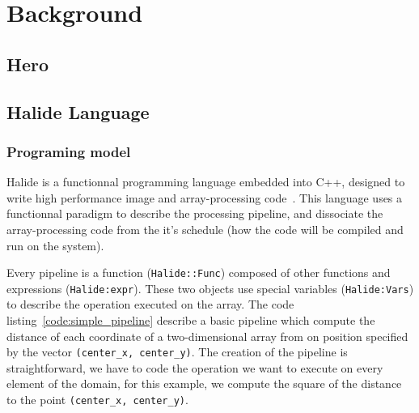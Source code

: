 
\chapter{Background}
\section{Hero}
\section{Halide Language}
	\subsection { Programing model}
		Halide is a functionnal programming language embedded into C++, designed to write high performance image and array-processing code~\cite{Web:Halide}. This language uses a functionnal paradigm to describe the processing pipeline, and dissociate the array-processing code from the it's schedule (how the code will be compiled and run on the system). 


		Every pipeline is a function (\verb|Halide::Func|) composed of other functions and expressions (\verb|Halide:expr|). These two objects  use special variables (\verb|Halide:Vars|) to describe the operation executed on the array. The code listing~\ref{code:simple_pipeline} 
		describe a basic pipeline which compute the distance of each coordinate of a two-dimensional array from on position specified by the vector \verb|(center_x, center_y)|. The creation of the pipeline is straightforward, we have to code the operation we want to execute on every element of the domain, for this example, we compute the square of the distance to the point \verb|(center_x, center_y)|.

